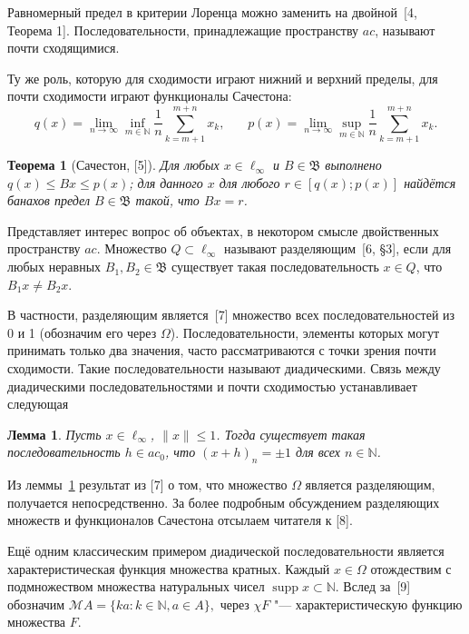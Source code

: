 \documentclass[14pt, a4paper]{extbook}
\newtheorem{theorem}{Теорема}
\newtheorem{lemma}{Лемма}
\begin{document}
Равномерный предел в критерии Лоренца можно заменить на двойной~[4, Теорема 1].
Последовательности, принадлежащие пространству $ac$, называют почти сходящимися.

Ту же роль, которую для сходимости играют нижний и верхний пределы,
для почти сходимости играют функционалы Сачестона:
	\begin{equation*}
		q(x) = \lim_{n\to\infty} \inf_{m\in\mathbb{N}}  \frac{1}{n} \sum_{k=m+1}^{m+n} x_k,
		~~~~~~~~
		p(x) = \lim_{n\to\infty} \sup_{m\in\mathbb{N}}  \frac{1}{n} \sum_{k=m+1}^{m+n} x_k.
	\end{equation*}

\begin{theorem}[{Сачестон, [5]}]
	Для любых $x\in \ell_\infty$ и $B\in\mathfrak{B}$
	выполнено
	$
		q(x) \leqslant Bx \leqslant p(x)
	$;
	для данного $x$ для любого $r\in[q(x); p(x)]$ найдётся банахов предел
	$B\in\mathfrak{B}$ такой, что $Bx = r$.
\end{theorem}



Представляет интерес вопрос об объектах, в некотором смысле двойственных пространству $ac$.
Множество $Q\subset\ell_\infty$ называют разделяющим~[6, \S 3], %
если для любых неравных $B_1, B_2\in\mathfrak{B}$ существует такая последовательность $x\in Q$,
что $B_1 x \neq B_2 x$.

В частности, разделяющим является~[7] %
множество всех последовательностей из 0 и 1
(обозначим его через $\Omega$).
Последовательности, элементы которых могут принимать только два значения,
часто рассматриваются с точки зрения почти сходимости.
Такие последовательности называют диадическими.
Связь между диадическими последовательностями и почти сходимостью
устанавливает следующая
\begin{lemma}
	\label{Avdeev_decomposition_lemma}
	Пусть $x\in\ell_\infty$, $\|x\|\leq 1$.
	Тогда существует такая последовательность $h\in ac_0$, что $(x+h)_n = \pm 1$ для всех $n\in\mathbb N$.
\end{lemma}

Из леммы~\ref{Avdeev_decomposition_lemma} результат из [7] о том, что множество $\Omega$
является разделяющим, получается непосредственно.
За более подробным обсуждением разделяющих множеств и функционалов Сачестона
отсылаем читателя к [8].

Ещё одним классическим примером диадической последовательности
является характеристическая функция множества кратных.
	Каждый $x\in \Omega$ отождествим с подмножеством множества натуральных чисел
	$\operatorname{supp} x \subset \mathbb{N}$.
	Вслед за~[9] обозначим %
	$
		\mathcal{M}A = \{ka: k\in\mathbb{N}, a\in A\}
		,
	$
	через $\chi F$ "--- характеристическую функцию множества $F$.
\end{document}
